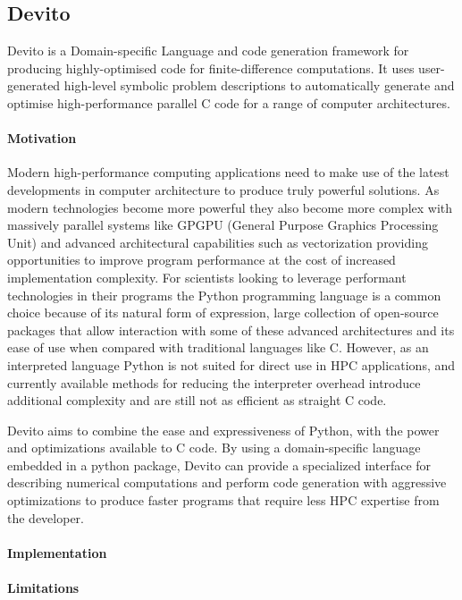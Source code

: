 \documentclass[a4paper,12pt,twoside]{report}
\begin{document}
\begin{itemize}
\chapter{Devito}
Devito is a Domain-specific Language and code generation framework for producing highly-optimised
code for finite-difference computations. It uses user-generated high-level symbolic problem descriptions to automatically
generate and optimise high-performance parallel C code for a range of computer architectures.
\subsubsection{Motivation}
Modern high-performance computing applications need to make use of the latest developments in computer architecture to produce truly
powerful solutions. As modern technologies become more powerful they also become more complex with massively parallel systems like
GPGPU (General Purpose Graphics Processing Unit) and advanced architectural capabilities such as vectorization providing opportunities
to improve program performance at the cost of increased implementation complexity. For scientists looking to leverage performant
technologies in their programs the Python programming language is a common choice because of its natural form of expression,
large collection of open-source packages that allow interaction with some of these advanced architectures and its ease of use when compared with traditional languages like C.
However, as an interpreted language Python is not suited for direct use in HPC applications, and currently available methods for reducing the interpreter overhead introduce
additional complexity and are still not as efficient as straight C code. 

Devito aims to combine the ease and expressiveness of Python, with the 
power and optimizations available to C code. By using a domain-specific language embedded in a python package, Devito can provide a specialized interface
for describing numerical computations and perform code generation with aggressive optimizations to produce faster programs that require less HPC expertise
from the developer.

\subsubsection{Implementation}
\subsubsection{Limitations}


\end{itemize}
\end{document}
